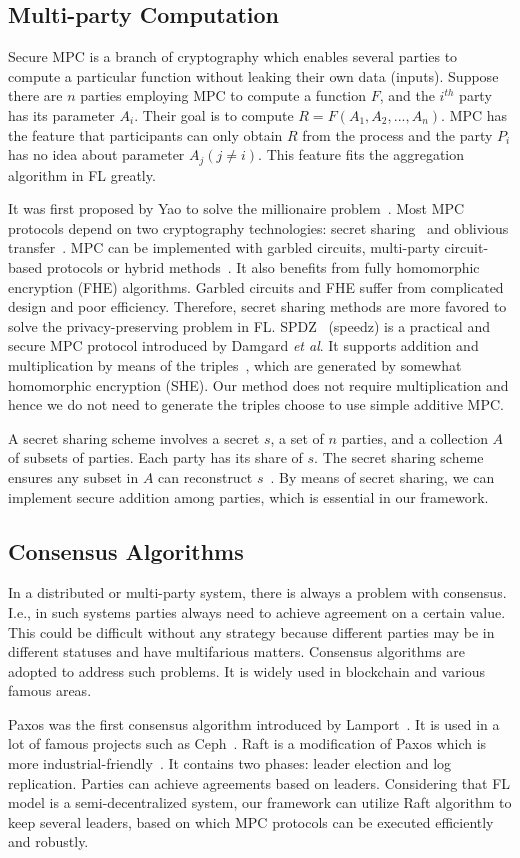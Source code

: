 \subsection{Multi-party Computation}
Secure MPC is a branch of cryptography which enables several parties to compute a particular function without leaking their own data (inputs). Suppose there are $n$ parties employing MPC to compute a function $F$, and the $i^{th}$ party has its parameter $A_i$. Their goal is to compute $R = F(A_1, A_2, ..., A_n)$. MPC has the feature that participants can only obtain $R$ from the process and the party $P_i$ has no idea about parameter $A_j (j \ne i)$. This feature fits the aggregation algorithm in FL greatly.

It was first proposed by Yao to solve the millionaire problem~\cite{Yao}. Most MPC protocols depend on two cryptography technologies: secret sharing~\cite{Shamir} and oblivious transfer~\cite{OT}. MPC can be implemented with garbled circuits, multi-party circuit-based protocols or hybrid methods~\cite{mpc-sok}. It also benefits from fully homomorphic encryption (FHE) algorithms. Garbled circuits and FHE suffer from complicated design and poor efficiency. Therefore, secret sharing methods are more favored to solve the privacy-preserving problem in FL. SPDZ~\cite{SPDZ} (speedz) is a practical and secure MPC protocol introduced by Damgard \emph{et al}. It supports addition and multiplication by means of the triples~\cite{Triple}, which are generated by somewhat homomorphic encryption (SHE). Our method does not require multiplication and hence we do not need to generate the triples choose to use simple additive MPC.

A secret sharing scheme involves a secret $s$, a set of $n$ parties, and a collection $A$ of subsets of parties. Each party has its share of $s$. The secret sharing scheme ensures any subset in $A$ can reconstruct $s$~\cite{Secret-Sharing-survey}. By means of secret sharing, we can implement secure addition among parties, which is essential in our framework.


\subsection{Consensus Algorithms}
In a distributed or multi-party system, there is always a problem with consensus. I.e., in such systems parties always need to achieve agreement on a certain value. This could be difficult without any strategy because different parties may be in different statuses and have multifarious matters. Consensus algorithms are adopted to address such problems. It is widely used in blockchain and various famous areas.

Paxos was the first consensus algorithm introduced by Lamport~\cite{Paxos}. It is used in a lot of famous projects such as Ceph~\cite{Ceph}. Raft is a modification of Paxos which is more industrial-friendly~\cite{Raft}. It contains two phases: leader election and log replication. Parties can achieve agreements based on leaders. Considering that FL model is a semi-decentralized system, our framework can utilize Raft algorithm to keep several leaders, based on which MPC protocols can be executed efficiently and robustly.
